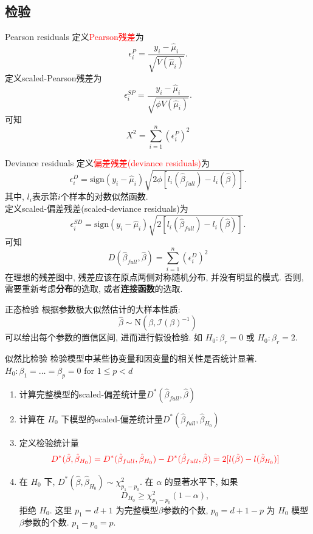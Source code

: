 \documentclass[professionalfont]{beamer}
\newcommand{\red}[1]{\textcolor{red}{#1}}
\begin{document}
\subsection{检验}
\begin{frame}{Pearson residuals}
	定义\red{Pearson残差}为
	$$\epsilon^P_i=\frac{y_i-\hat{\mu}_i}{\sqrt{V(\hat{\mu}_i)}}.$$
	定义scaled-Pearson残差为
	$$\epsilon^{SP}_i=\frac{y_i-\hat{\mu}_i}{\sqrt{\phi V(\hat{\mu}_i)}}.$$
	可知
	$$X^2=\sum_{i=1}^n\left(\epsilon_i^P\right)^2$$
\end{frame}
\begin{frame}{Deviance residuals}
	定义\red{偏差残差(deviance residuals)}为
	$$\epsilon^D_i=\text{sign}(y_i-\hat{\mu}_i) \sqrt{2\phi[l_i(\hat{\beta}_{full})-l_i(\hat{\beta})]}.$$
其中, $l_i$表示第$i$个样本的对数似然函数.\\
	定义scaled-偏差残差(scaled-deviance residuals)为
	$$\epsilon^{SD}_i=\text{sign}(y_i-\hat{\mu}_i)\sqrt{2[l_i(\hat{\beta}_{full})-l_i(\hat{\beta})]}.$$
	可知
	$$D(\hat{\beta}_{full},\hat{\beta})=\sum_{i=1}^n\left(\epsilon_i^D\right)^2$$
	在理想的残差图中, 残差应该在原点两侧对称随机分布, 并没有明显的模式. 否则, 需要重新考虑\textbf{分布}的选取, 或者\textbf{连接函数}的选取.
\end{frame}
\begin{frame}{正态检验}
	根据参数极大似然估计的大样本性质:
	\begin{equation*}\label{fisher2}
	\hat{\beta}\sim \text{N}(\beta, \mathcal{I}(\beta)^{-1})
	\end{equation*}
	可以给出每个参数的置信区间, 进而进行假设检验. 如 $H_0: \beta_r=0$ 或 $H_0: \beta_r=2$.
\end{frame}
\begin{frame}{似然比检验}
	检验模型中某些协变量和因变量的相关性是否统计显著.
	$H_0: \beta_1=\ldots=\beta_p=0$ for $1\le p<d$
	\begin{enumerate}
		\item 计算完整模型的scaled-偏差统计量$D^*(\hat{\beta}_{full},\hat{\beta})$
		\item 计算在 $H_0$ 下模型的scaled-偏差统计量$D^*(\hat{\beta}_{full},\hat{\beta}_{H_0})$
		\item 定义检验统计量
		\begin{equation}\label{chi}
		\red{D^*(\hat{\beta},\hat{\beta}_{H_0})=D^*(\hat{\beta}_{full},\hat{\beta}_{H_0})-D^*(\hat{\beta}_{full},\hat{\beta})=2[l(\hat{\beta})-l(\hat{\beta}_{H_0})]}
		\end{equation}
		\item  在 $H_0$ 下, $D^*(\hat{\beta},\hat{\beta}_{H_0})\sim\chi^2_{p_1-p_0}$.  在 $\alpha$ 的显著水平下, 如果$$D_{H_0}\geq\chi^2_{p_1-p_0}(1-\alpha),$$
		拒绝 $H_0$. 这里 $p_1=d+1$ 为完整模型$\beta$参数的个数, $p_0=d+1-p$ 为 $H_0$ 模型$\beta$参数的个数. $p_1-p_0=p$.
	\end{enumerate}
\end{frame}
\end{document}
